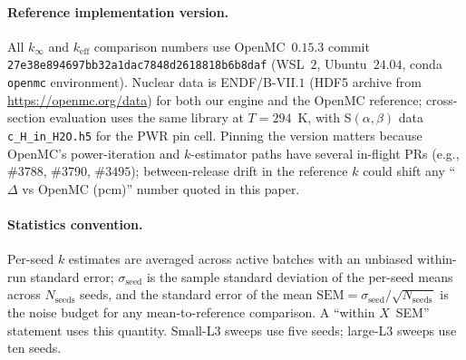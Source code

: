 \paragraph{Reference implementation version.}
All $k_\infty$ and $k_\mathrm{eff}$ comparison numbers use
OpenMC~$0.15.3$ commit
\texttt{27e38e894697bb32a1dac7848d2618818b6b8daf}
(WSL~$2$, Ubuntu~$24.04$, conda \texttt{openmc} environment).
Nuclear data is ENDF/B-VII.$1$ (HDF5 archive from
\url{https://openmc.org/data}) for both our engine and the
OpenMC reference; cross-section evaluation uses the same
library at $T = 294$~K, with S$(\alpha,\beta)$ data
\texttt{c\_H\_in\_H2O.h5} for the PWR pin cell. Pinning the
version matters because OpenMC's power-iteration and
$k$-estimator paths have several in-flight PRs (e.g., $\#3788$,
$\#3790$, $\#3495$); between-release drift in the reference
$k$ could shift any ``$\Delta$ vs OpenMC (pcm)'' number
quoted in this paper.

\paragraph{Statistics convention.}
Per-seed $k$ estimates are averaged across active batches
with an unbiased within-run standard error;
$\sigma_\text{seed}$ is the sample standard deviation of
the per-seed means across $N_\text{seeds}$ seeds, and the
standard error of the mean $\mathrm{SEM} =
\sigma_\text{seed} / \sqrt{N_\text{seeds}}$ is the noise
budget for any mean-to-reference comparison. A
``within $X$~SEM'' statement uses this quantity. Small-L3
sweeps use five seeds; large-L3 sweeps use ten seeds.


